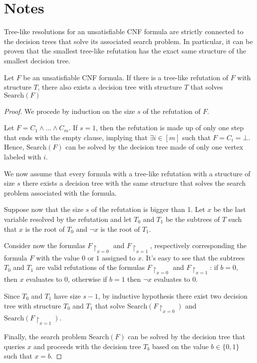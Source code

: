 

\chapter{Notes} \label{chap:notes}

Tree-like resolutions for an unsatisfiable CNF formula are strictly connected to the decision trees that solve its associated search problem. In particular, it can be proven that the smallest tree-like refutation has the exact same structure of the smallest decision tree. 

\begin{lemma} \label{lem:treeres_dt}
    \cite{treelike_res_size}
    Let $F$ be an unsatisfiable CNF formula. If there is a tree-like refutation of $F$ with structure $T$, there also exists a decision tree with structure $T$ that solves $\mathrm{Search}(F)$
\end{lemma}

\begin{proof}
    We procede by induction on the size $s$ of the refutation of $F$.

    Let $F = C_1 \land \ldots \land C_m$. If $s = 1$, then the refutation is made up of only one step that ends with the empty clause, implying that $\exists i \in [m]$ such that $F = C_i = \bot$. Hence, $\mathrm{Search}(F)$ can be solved by the decision tree made of only one vertex labeled with $i$.

    We now assume that every formula with a tree-like refutation with a structure of size $s$ there exists a decision tree with the same structure that solves the search problem associated with the formula.

    Suppose now that the size $s$ of the refutation is bigger than 1. Let $x$ be the last variable resolved by the refutation and let $T_0$ and $T_1$ be the subtrees of $T$ such that $x$ is the root of $T_0$ and $\lnot{x}$ is the root of $T_1$.

    Consider now the formulas $F{\upharpoonright_{x=0}}$ and $F{\upharpoonright_{x=1}}$, respectively corresponding the formula $F$ with the value $0$ or $1$ assigned to $x$. It's easy to see that the subtrees $T_0$ and $T_1$ are valid refutations of the formulas $F{\upharpoonright_{x=0}}$ and $F{\upharpoonright_{x=1}}$: if $b = 0$, then $x$ evaluates to $0$, otherwise if $b = 1$ then $\lnot{x}$ evaluates to 0.

    Since $T_0$ and $T_1$ have size $s-1$, by inductive hypothesis there exist two decision tree with structure $T_0$ and $T_1$ that solve $\mathrm{Search}(F{\upharpoonright_{x=0}})$ and $\mathrm{Search}(F{\upharpoonright_{x=1}})$.

    Finally, the search problem $\mathrm{Search}(F)$ can be solved by the decision tree that queries $x$ and proceeds with the decision tree $T_b$ based on the value $b \in \{0,1\}$ such that $x = b$.

\end{proof}

